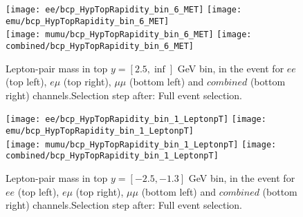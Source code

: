 \clearpage
\newpage
\begin{figure}
  \texttt{[image: ee/bcp\_HypTopRapidity\_bin\_6\_MET]}
  \texttt{[image: emu/bcp\_HypTopRapidity\_bin\_6\_MET]}\\
  \texttt{[image: mumu/bcp\_HypTopRapidity\_bin\_6\_MET]}
  \texttt{[image: combined/bcp\_HypTopRapidity\_bin\_6\_MET]}
\caption{Lepton-pair mass in top $y = [2.5,\inf]$ GeV bin, in the event for $ee$ (top left), $e\mu$ (top right), $\mu\mu$ (bottom left) and $combined$ (bottom right) channels.\newline Selection step after: Full event selection.}
\end{figure}

\clearpage
\newpage










% 
% 

\begin{figure}
  \texttt{[image: ee/bcp\_HypTopRapidity\_bin\_1\_LeptonpT]}
  \texttt{[image: emu/bcp\_HypTopRapidity\_bin\_1\_LeptonpT]}\\
  \texttt{[image: mumu/bcp\_HypTopRapidity\_bin\_1\_LeptonpT]}
  \texttt{[image: combined/bcp\_HypTopRapidity\_bin\_1\_LeptonpT]}
\caption{Lepton-pair mass in top $y = [-2.5,-1.3]$ GeV bin, in the event for $ee$ (top left), $e\mu$ (top right), $\mu\mu$ (bottom left) and $combined$ (bottom right) channels.\newline Selection step after: Full event selection.}
\end{figure}

